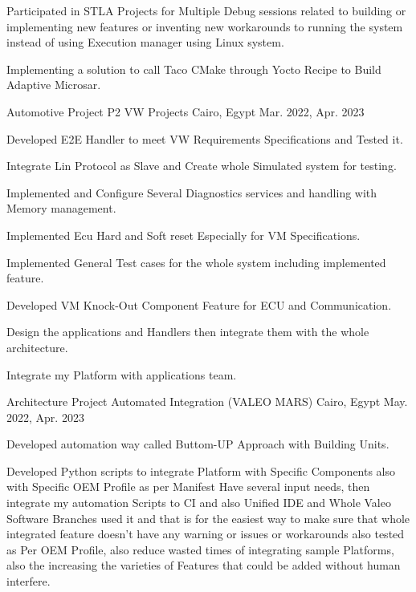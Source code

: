 \begin{cventries}
{\begin{cvitems}
    \item {Participated in STLA Projects for Multiple Debug sessions related to building or implementing new features or inventing new workarounds to running the system instead of using Execution manager using Linux system.}
    \item {Implementing a solution to call Taco CMake through Yocto Recipe to Build Adaptive Microsar.}
  \end{cvitems}
}
\cventry
{\normalsize Automotive Project} %
{\Large P2 VW Projects} %
{\normalsize Cairo, Egypt} %
{\normalsize Mar. 2022, Apr. 2023} %
{
  \begin{cvitems} %
    \item {Developed E2E Handler to meet VW Requirements Specifications and Tested it.}
    \item {Integrate Lin Protocol as Slave and Create whole Simulated system for testing.}
    \item {Implemented and Configure Several Diagnostics services and handling with Memory management.}
    \item {Implemented Ecu Hard and Soft reset Especially for VM Specifications.}
    \item {Implemented General Test cases for the whole system including implemented feature.}
    \item {Developed VM Knock-Out Component Feature for ECU and Communication.}
    \item {Design the applications and Handlers then integrate them with the whole architecture.}
    \item {Integrate my Platform with applications team.}
  \end{cvitems}
}
\cventry
{\normalsize Architecture Project} %
{\Large Automated Integration (VALEO MARS)} %
{\normalsize Cairo, Egypt} %
{\normalsize May. 2022, Apr. 2023} %
{
    \begin{cvitems} %
        \item {\normalsize Developed automation way called Buttom-UP Approach with Building Units. }
        \item {\normalsize Developed Python scripts to integrate Platform with Specific Components also with Specific OEM Profile as per Manifest Have several input needs, then integrate my automation Scripts to CI and also Unified IDE and Whole Valeo Software Branches used it and that is for the easiest way to make sure that whole integrated feature doesn't have any warning or issues or workarounds also tested as Per OEM Profile, also reduce wasted times of integrating sample Platforms, also the increasing the varieties of Features that could be added without human interfere.}

\end{cvitems}}
\end{cventries}
